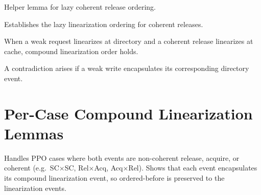 \begin{lemma}
  \label{lem:lazy_coherent_release_ordering_helper}
  \leanok
  Helper lemma for lazy coherent release ordering.
\end{lemma}

\begin{lemma}
  \label{lem:lazy_coherent_release_ordering}
  \leanok
  Establishes the lazy linearization ordering for coherent releases.
\end{lemma}

\begin{lemma}
  \label{lem:weak_req_dir_crel_cache}
  \leanok
  When a weak request linearizes at directory and a coherent release
  linearizes at cache, compound linearization order holds.
\end{lemma}

\begin{lemma}
  \label{lem:contradiction_weak_write_encap_dir}
  \leanok
  A contradiction arises if a weak write encapsulates its corresponding
  directory event.
\end{lemma}

\section{Per-Case Compound Linearization Lemmas}
\label{sec:cache-request-linearization-of-specific-cases}

\begin{lemma}
  \label{lem:clo_two_events_encap_lin}
  \leanok
  Handles PPO cases where both events are non-coherent release, acquire,
  or coherent (e.g.\ SC$\times$SC, Rel$\times$Acq, Acq$\times$Rel).
  Shows that each event encapsulates its compound linearization event,
  so ordered-before is preserved to the linearization events.
\end{lemma}

